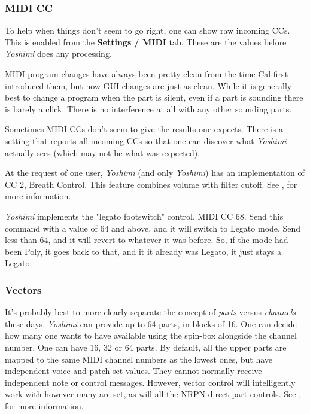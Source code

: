 \documentclass[
 11pt,
 twoside,
 a4paper,
 final                                 %
]{article}
\begin{document}
\subsubsection{MIDI CC}
\label{subsubsec:new_features_midi_cc}

   To help when things don't seem to go right, one can show raw incoming
   CCs. This is enabled from the \textbf{Settings / MIDI} tab.
   These are the values before \textsl{Yoshimi} does any processing.

   MIDI program changes have always been pretty clean from the time Cal first
   introduced them, but now GUI changes are just as clean. While it is
   generally best to change a program when the part is silent, even if a part
   is sounding there is barely a click. There is no interference at all
   with any other sounding parts.

   Sometimes MIDI CCs don't seem to give the results one expects. There is
   a setting that reports all incoming CCs so that one can discover
   what \textsl{Yoshimi} actually sees (which may not be what was expected).

   At the request of one user, \textsl{Yoshimi} (and only \textsl{Yoshimi})
   has an implementation of CC 2, Breath Control.
   This feature combines volume with filter cutoff.
   See , for more information.

   \textsl{Yoshimi} implements the "legato footswitch" control,
   MIDI CC 68.
   Send this command with a value of 64 and above, and it will
   switch to Legato mode. Send less than 64, and it will revert to whatever it
   was before.  So, if the mode had been Poly, it goes back to that, and it it
   already was Legato, it just stays a Legato.

\subsubsection{Vectors}
\label{subsubsec:new_features_vectors}

   It's probably best to more clearly separate the concept of
   \textsl{parts} versus \textsl{channels} these days.
   \textsl{Yoshimi} can provide up to 64 parts, in blocks of 16. One can
   decide how many one wants to have available using the spin-box alongside
   the channel number.  One can have 16, 32 or 64 parts.  By default, all the
   upper parts are mapped to the same MIDI channel numbers as the lowest ones,
   but have independent voice and patch set values. They cannot normally
   receive independent note or control messages. However, vector control will
   intelligently work with however many are set, as will all the NRPN direct
   part controls.
   See , for more information.
\end{document}
